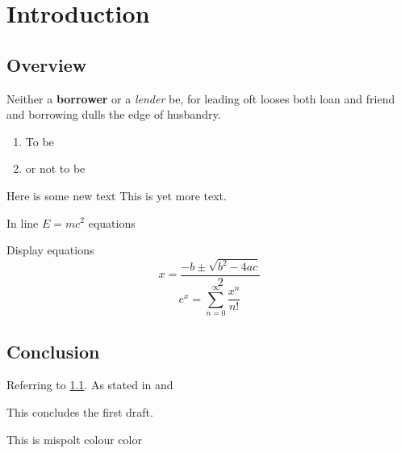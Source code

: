 \chapter{Introduction}

\section{Overview}
\label{Sec:Overview}

Neither a \textbf{borrower} or a \textit{lender} be, for leading oft looses both loan and friend and borrowing dulls the edge of husbandry.
\begin{enumerate}
\item To be
\item or not to be

\end{enumerate}

Here is some new text This is yet more text.

In line $E=mc^2$ equations

Display equations
\[
x=\frac{-b\pm\sqrt{b^2-4ac}}{2}
\]
\[
e^x = \sum_{n=0}^\infty\frac{x^n}{n!}
\]
\section{Conclusion}

Referring to \ref{Sec:Overview}. As stated in \cite[Section 2]{Bunce1992TheAlgebra} and \cite{Kaup1977AlgebraicBanachmanifolds}

This concludes the first draft.

This is mispolt colour color 